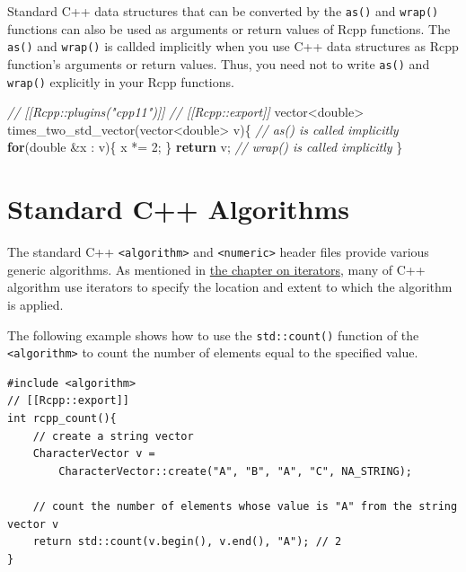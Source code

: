 \documentclass[
]{book}
\newenvironment{Shaded}{\begin{snugshade}}{\end{snugshade}}
\newcommand{\CommentTok}[1]{\textcolor[rgb]{0.56,0.35,0.01}{\textit{#1}}}
\newcommand{\ControlFlowTok}[1]{\textcolor[rgb]{0.13,0.29,0.53}{\textbf{#1}}}
\newcommand{\DataTypeTok}[1]{\textcolor[rgb]{0.13,0.29,0.53}{#1}}
\newcommand{\DecValTok}[1]{\textcolor[rgb]{0.00,0.00,0.81}{#1}}
\newcommand{\NormalTok}[1]{#1}
\begin{document}
Standard C++ data structures that can be converted by the \texttt{as()} and \texttt{wrap()} functions can also be used as arguments or return values of Rcpp functions. The \texttt{as()} and \texttt{wrap()} is callded implicitly when you use C++ data structures as Rcpp function's arguments or return values. Thus, you need not to write \texttt{as()} and \texttt{wrap()} explicitly in your Rcpp functions.

\begin{Shaded}
\begin{Highlighting}[]
\CommentTok{// [[Rcpp::plugins("cpp11")]]}
\CommentTok{// [[Rcpp::export]]}
\NormalTok{vector<}\DataTypeTok{double}\NormalTok{> times_two_std_vector(vector<}\DataTypeTok{double}\NormalTok{> v)\{ }\CommentTok{// as() is called implicitly}
    \ControlFlowTok{for}\NormalTok{(}\DataTypeTok{double}\NormalTok{ &x : v)\{}
\NormalTok{        x *= }\DecValTok{2}\NormalTok{;}
\NormalTok{    \}}
    \ControlFlowTok{return}\NormalTok{ v; }\CommentTok{// wrap() is called implicitly}
\NormalTok{\}}
\end{Highlighting}
\end{Shaded}

\hypertarget{standard-c-algorithms}{%
\section{Standard C++ Algorithms}\label{standard-c-algorithms}}

The standard C++ \texttt{\textless{}algorithm\textgreater{}} and \texttt{\textless{}numeric\textgreater{}} header files provide various generic algorithms. As mentioned in \href{290_iterator.html}{the chapter on iterators}, many of C++ algorithm use iterators to specify the location and extent to which the algorithm is applied.

The following example shows how to use the \texttt{std::count()} function of the \texttt{\textless{}algorithm\textgreater{}} to count the number of elements equal to the specified value.

\begin{verbatim}
#include <algorithm>
// [[Rcpp::export]]
int rcpp_count(){
    // create a string vector
    CharacterVector v =
        CharacterVector::create("A", "B", "A", "C", NA_STRING);

    // count the number of elements whose value is "A" from the string vector v
    return std::count(v.begin(), v.end(), "A"); // 2
}
\end{verbatim}
\end{document}
